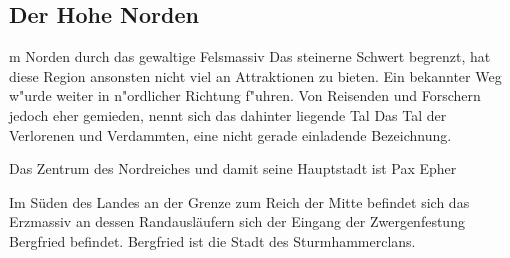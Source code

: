 \subsection{Der Hohe Norden}
m Norden durch
das gewaltige Felsmassiv \glqq Das steinerne
Schwert\grqq{} begrenzt, hat diese
Region ansonsten nicht viel an Attraktionen zu bieten. Ein bekannter
Weg w"urde weiter in n"ordlicher Richtung f"uhren. Von Reisenden und
Forschern jedoch eher gemieden, nennt sich das dahinter liegende Tal
\glqq Das Tal der Verlorenen und Verdammten\grqq{}, eine nicht gerade einladende
Bezeichnung.
\par Das Zentrum des Nordreiches und damit seine Hauptstadt ist 
Pax Epher
\par Im Süden des Landes an der Grenze zum Reich der Mitte befindet sich das
Erzmassiv an dessen Randausläufern sich der Eingang der Zwergenfestung Bergfried
befindet. Bergfried ist die Stadt des Sturmhammerclans.
